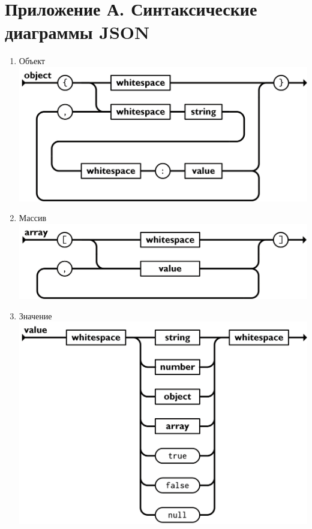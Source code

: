 \documentclass[a4page]{article}
\begin{document}
\section*{Приложение А. Синтаксические диаграммы JSON} \label{appendix}
\begin{enumerate}
	\item Объект \\
	      \includegraphics[scale=0.6]{object.png}
	\item Массив \\
	      \includegraphics[scale=0.6]{array.png}
	\item Значение \\
	      \includegraphics[scale=0.6]{value.png}
	      \newpage

\end{enumerate}
\end{document}
